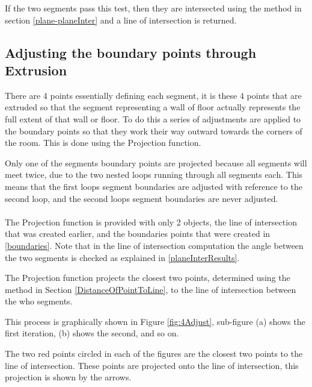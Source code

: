 			If the two segments pass this test, then they are intersected using the method in section \ref{plane-planeInter} and a line of intersection is returned.
			
		\subsection{Adjusting the boundary points through\\ Extrusion}
		\label{Extrusion}
			There are 4 points essentially defining each segment, it is these 4 points that are extruded so that the segment representing a wall of floor actually represents the full extent of that wall or floor. To do this a series of adjustments are applied to the boundary points so that they work their way outward towards the corners of the room. This is done using the Projection function.
			
			Only one of the segments boundary points are projected because all segments will meet twice, due to the two nested loops running through all segments each. This means that the first loops segment boundaries are adjusted with reference to the second loop, and the second loops segment boundaries are never adjusted.\\
			\\
			The Projection function is provided with only 2 objects, the line of intersection that was created earlier, and the boundaries points that were created in \ref{boundaries}. Note that in the line of intersection computation the angle between the two segments is checked as explained in \ref{planeInterResults}.
			
			The Projection function projects the closest two points, determined using the method in Section \ref{DistanceOfPointToLine}, to the line of intersection between the who segments.
			
			This process is graphically shown in Figure \ref{fig:4Adjust},  sub-figure (a) shows the first iteration, (b) shows the second, and so on.
			
			The two red points circled in each of the figures are the closest two points to the line of intersection. These points are projected onto the line of intersection, this projection is shown by the arrows.
			
